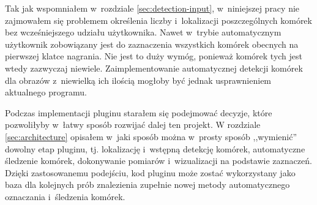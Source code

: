 \documentclass[declaration,shortabstract,mgr]{iithesis}
\begin{document}
Tak jak wspomniałem w~rozdziale \ref{sec:detection-input}, w~niniejszej pracy nie zajmowałem się problemem określenia liczby i~lokalizacji poszczególnych komórek bez wcześniejszego udziału użytkownika.
Nawet w~trybie automatycznym użytkownik zobowiązany jest do zaznaczenia wszystkich komórek obecnych na pierwszej klatce nagrania.
Nie jest to duży wymóg, ponieważ komórek tych jest wtedy zazwyczaj niewiele.
Zaimplementowanie automatycznej detekcji komórek dla obrazów z~niewielką ich ilością mogłoby być jednak usprawnieniem aktualnego programu.

Podczas implementacji pluginu starałem się podejmować decyzje, które pozwoliłyby w~łatwy sposób rozwijać dalej ten projekt.
W rozdziale \ref{sec:architecture} opisałem w~jaki sposób można w~prosty sposób ,,wymienić'' dowolny etap pluginu, tj. lokalizację i~wstępną detekcję komórek, automatyczne śledzenie komórek, dokonywanie pomiarów i~wizualizacji na podstawie zaznaczeń.
Dzięki zastosowanemu podejściu, kod pluginu może zostać wykorzystany jako baza dla kolejnych prób znalezienia zupełnie nowej metody automatycznego oznaczania i~śledzenia komórek.






\end{document}
